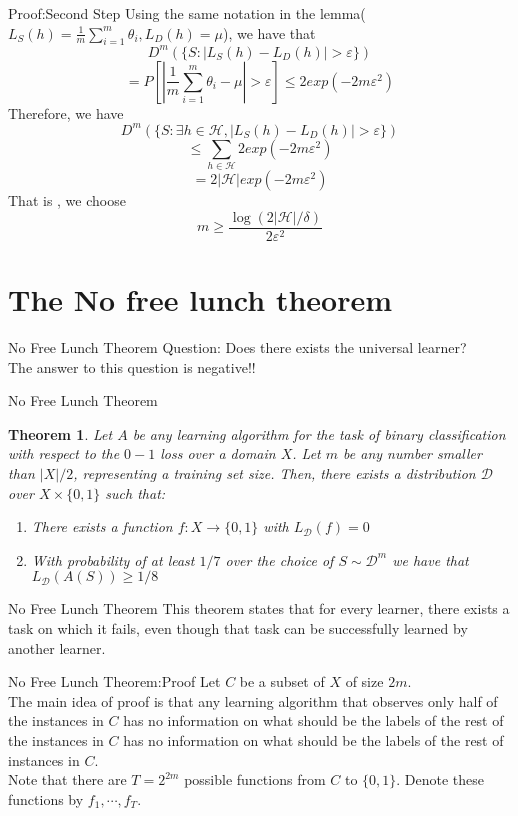 \documentclass{beamer}
\newtheorem{thm}{Theorem}[subsection]
\begin{document}
\begin{frame}{Proof:Second Step}
	Using the same notation in the lemma($L_S(h) = \frac{1}{m} \sum^m_{i=1} \theta_i,L_D(h) = \mu$), we have that 
	\[D^{m}(\{S: |L_S(h) - L_D(h)| > \varepsilon\})\]
\[=P[|\frac{1}{m} \sum^m_{i=1} \theta_i - \mu| > \varepsilon] \leq 2 exp(-2 m \varepsilon^2)\]
Therefore, we have
\[D^{m}(\{S: \exists h \in \mathcal{H}, |L_S(h) - L_D(h)| > \varepsilon\})\]
\[\leq \sum_{h \in \mathcal{H}} 2 exp(-2m \varepsilon^2)\]
\[= 2 |\mathcal{H}| exp(-2m\varepsilon^2)\]
That is , we choose 
\[m  \geq \frac{\log(2|\mathcal{H}|/\delta)}{2\varepsilon^2}\]
\end{frame}
\section{The No free lunch theorem}
\begin{frame}{No Free Lunch Theorem}
	Question: Does there exists the universal learner? \\ 
	The answer to this question is negative!! 
\end{frame}
\begin{frame}{No Free Lunch Theorem}
	\begin{thm}
		Let $A$ be any learning algorithm for the task of binary classification with respect to the $0-1$ loss over a domain $X$. Let $m$ be any number smaller than $|X|/2$, representing a training set size. Then, there exists a distribution $\mathcal{D}$ over $X \times \{0,1\}$ such that:
		\begin{enumerate}
			\item There exists a function $f: X \rightarrow \{0,1\}$ with $L_{\mathcal{D}}(f)=0$
			\item With probability of at least $1/7$ over the choice of $S \sim \mathcal{D}^m$ we have that $L_{\mathcal{D}}(A(S)) \geq 1/8$
		\end{enumerate}
	\end{thm}
\end{frame}
\begin{frame}{No Free Lunch Theorem}
	This theorem states that for every learner, there exists a task on which it fails, even though that task can be successfully learned by another learner.
\end{frame}
\begin{frame}{No Free Lunch Theorem:Proof}
	Let $C$ be a subset of $X$ of size $2m$. \\
	The main idea of proof is that any learning algorithm that observes only half of the instances in $C$ has no information on what should be the labels of the rest of the instances in $C$ has no information on what should be the labels of the rest of instances in $C$. \\ 
	Note that there are $T=2^{2m}$ possible functions from $C$ to $\{0,1\}$. Denote these functions by $f_1,\cdots,f_T$.
\end{frame}
\end{document}
